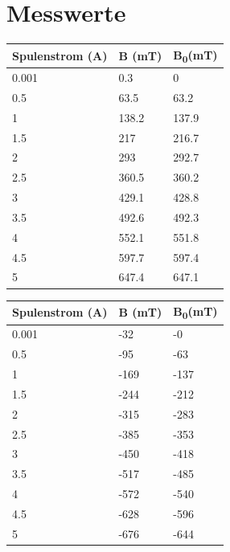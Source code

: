 \documentclass[titlepage=firstcover, captions=tableheading]{scrartcl}
\begin{document}
\section{Messwerte}
\begin{center}
    \begin{tabular}{lll}
        \toprule
        Spulenstrom (A) & B (mT) & B\textsubscript{0}(mT) \\
        \midrule 
        0.001     &      0.3  &   0\\
        0.5       &      63.5 &   63.2 \\
        1         &      138.2&   137.9\\
        1.5       &      217  &   216.7\\
        2         &      293  &   292.7\\
        2.5       &      360.5&   360.2\\
        3         &      429.1&   428.8\\
        3.5       &      492.6&   492.3\\
        4         &      552.1&   551.8\\
        4.5       &      597.7&   597.4\\
        5         &      647.4&   647.1\\
        \bottomrule
    \end{tabular}
\end{center}

\begin{center}
    \begin{tabular}{lll}
        \toprule
        Spulenstrom (A) & B (mT) & B\textsubscript{0}(mT) \\
        \midrule 
        0.001     &   -32    & -0 \\
        0.5       &   -95    & -63 \\
        1         &   -169   & -137\\ 
        1.5       &   -244   & -212\\ 
        2         &   -315   & -283\\ 
        2.5       &   -385   & -353\\ 
        3         &   -450   & -418\\ 
        3.5       &   -517   & -485\\ 
        4         &   -572   & -540\\ 
        4.5       &   -628   & -596\\ 
        5         &   -676   & -644\\
        \bottomrule
    \end{tabular}
\end{center}
\end{document}
